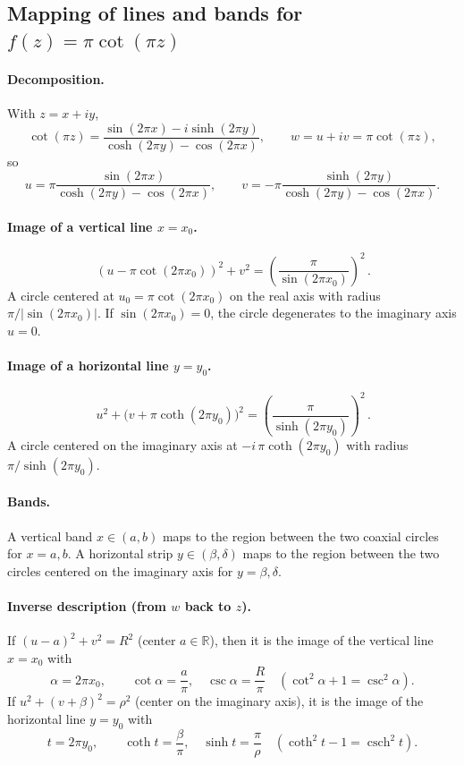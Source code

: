 \documentclass[12pt,a4paper]{article}
\DeclareMathOperator{\csch}{csch}
\begin{document}
	\subsection*{Mapping of lines and bands for \(f(z)=\pi\cot(\pi z)\)}
	
	\paragraph{Decomposition.}
	With \(z=x+iy\),
	\[
	\cot(\pi z)=\frac{\sin(2\pi x)-i\sinh(2\pi y)}{\cosh(2\pi y)-\cos(2\pi x)},
	\qquad
	w=u+iv=\pi\cot(\pi z),
	\]
	so
	\[
	u=\pi\frac{\sin(2\pi x)}{\cosh(2\pi y)-\cos(2\pi x)},\qquad
	v=-\pi\frac{\sinh(2\pi y)}{\cosh(2\pi y)-\cos(2\pi x)}.
	\]
	
	\paragraph{Image of a vertical line \(x=x_0\).}
	\[
	\boxed{\, (u-\pi\cot(2\pi x_0))^{2}+v^{2}=\left(\frac{\pi}{\sin(2\pi x_0)}\right)^{2} \, }.
	\]
	A circle centered at \(u_0=\pi\cot(2\pi x_0)\) on the real axis with radius \(\pi/|\sin(2\pi x_0)|\).
	If \(\sin(2\pi x_0)=0\), the circle degenerates to the imaginary axis \(u=0\).
	
	\paragraph{Image of a horizontal line \(y=y_0\).}
	\[
	\boxed{\, u^{2}+\bigl(v+\pi\coth(2\pi y_0)\bigr)^{2}
		=\left(\frac{\pi}{\sinh(2\pi y_0)}\right)^{2} \, }.
	\]
	A circle centered on the imaginary axis at \(-i\,\pi\coth(2\pi y_0)\) with radius \(\pi/\sinh(2\pi y_0)\).
	
	\paragraph{Bands.}
	A vertical band \(x\in(a,b)\) maps to the region between the two coaxial circles for \(x=a,b\).
	A horizontal strip \(y\in(\beta,\delta)\) maps to the region between the two circles centered on the
	imaginary axis for \(y=\beta,\delta\).
	
	\paragraph{Inverse description (from \(w\) back to \(z\)).}
	If \((u-a)^{2}+v^{2}=R^{2}\) (center \(a\in\mathbb R\)), then it is the image of the vertical line
	\(x=x_0\) with
	\[
	\alpha=2\pi x_0,\qquad \cot\alpha=\frac{a}{\pi},\quad \csc\alpha=\frac{R}{\pi}
	\quad(\cot^{2}\alpha+1=\csc^{2}\alpha).
	\]
	If \(u^{2}+(v+\beta)^{2}=\rho^{2}\) (center on the imaginary axis), it is the image of the horizontal line
	\(y=y_0\) with
	\[
	t=2\pi y_0,\qquad \coth t=\frac{\beta}{\pi},\quad \sinh t=\frac{\pi}{\rho}
	\quad(\coth^{2}t-1=\csch^{2}t).
	\]
	
\end{document}
